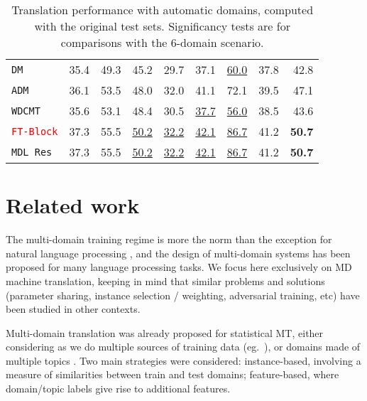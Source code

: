 \documentclass[11pt,a4paper]{article}
\newcommand{\fyDone}[1]{\done[FY]\Todo[FY:]{\textcolor{orange}{#1}}}
\newcommand{\revision}[1]{\textcolor{red}{#1}}
\newcommand{\system}[1]{\texttt{{#1}}}
\newcommand{\SB}[1]{\textbf{#1}}
\newcommand{\SW}[1]{\underline{#1}}
\begin{document}
\begin{table*}[t]
\begin{tabular}{|p{3cm}|*{8}{r|}}
    \system{DM}             & 35.4 & 49.3  & 45.2 & 29.7 & 37.1 & \SW{60.0} & 37.8 & 42.8 \\ %
    \system{ADM}           & 36.1 & 53.5  & 48.0 & 32.0 & 41.1 & 72.1 & 39.5 & 47.1\\%
    \system{WDCMT}       & 35.6 & 53.1 & 48.4 & 30.5 & \SW{37.7} & \SW{56.0} & 38.5 & 43.6 \\ %
    \revision{\system{FT-Block}}     & 37.3 & 55.5  & \SW{50.2}   & \SW{32.2}   &  \SW{42.1}  & \SW{86.7} & 41.2 & \SB{50.7}\\%
    \system{MDL Res}     & 37.3 & 55.5  & \SW{50.2}   & \SW{32.2}   &  \SW{42.1}  & \SW{86.7} & 41.2 & \SB{50.7}\\%
     \hline
  \end{tabular}
  \caption{Translation performance with automatic domains, computed with the original test sets. Significancy tests are for comparisons with the 6-domain scenario.}
  \label{tab:subdomains}
  \fyDone{Fill the table with correct results,}\fyDone{Change wavg and avg}
\end{table*}

\section{Related work \label{sec:related}}

The multi-domain training regime is more the norm than the exception for natural language processing \cite{Dredze08online,Finkel09hierarchical}, and the design of multi-domain systems has been proposed for many language processing tasks. We focus here exclusively on MD machine translation, keeping in mind that similar problems and solutions (parameter sharing, instance selection / weighting, adversarial training, etc) have been studied in other contexts.

Multi-domain translation was already proposed for statistical MT, either considering as we do multiple sources of training data (eg.\ \cite{Banerjee10combining,Clark12onesystem,Sennrich13multidomain,Huck15mixeddomain}), or domains made of multiple topics\fyDone{you mean multiple topics?} \cite{Eidelman12topic,Hasler14dynamic-topic}.\fyDone{Add also topic models refs} Two main strategies were considered: instance-based, involving a measure of similarities between train and test domains; feature-based, where domain/topic labels give rise to additional features. 
\end{document}
